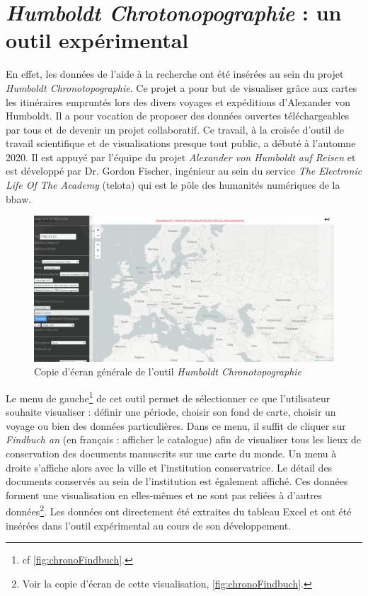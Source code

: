 \documentclass[a4paper, 12pt, twoside]{book}
\begin{document}
\section{\textit{Humboldt Chrotonopographie} : un outil expérimental}
\label{sect:chronotopographie}
En effet, les données de l'aide à la recherche ont été insérées au sein du projet \textit{Humboldt Chronotopographie}. Ce projet a pour but de visualiser grâce aux cartes les itinéraires empruntés lors des divers voyages et expéditions d'Alexander von Humboldt. Il a pour vocation de proposer des données ouvertes téléchargeables par tous et de devenir un projet collaboratif. Ce travail, à la croisée d'outil de travail scientifique et de visualisations presque tout public, a débuté à l'automne 2020. Il est appuyé par l'équipe du projet \textit{Alexander von Humboldt auf Reisen} et est développé par Dr. Gordon Fischer, ingénieur au sein du service \textit{The Electronic Life Of The Academy} (\gls{telota}) qui est le pôle des humanités numériques de la \gls{bbaw}.
\begin{figure}[h]
    \centering
    \caption{Copie d'écran générale de l'outil \textit{Humboldt Chronotopographie}}
    \includegraphics[scale=0.4]{img/chronotopographie/chrono_general.png}
    \hfill
\end{figure}

Le menu de gauche\footnote{cf \autoref{fig:chronoFindbuch}.} de cet outil permet de sélectionner ce que l'utilisateur souhaite visualiser : définir une période, choisir son fond de carte, choisir un voyage ou bien des données particulières. Dans ce menu, il suffit de cliquer sur \textit{Findbuch an} (en français : afficher le catalogue) afin de visualiser tous les lieux de conservation des documents manuscrits sur une carte du monde. Un menu à droite s'affiche alors avec la ville et l'institution conservatrice. Le détail des documents conservés au sein de l'institution est également affiché. Ces données forment une visualisation en elles-mêmes et ne sont pas reliées à d'autres données\footnote{Voir la copie d'écran de cette visualisation,  \autoref{fig:chronoFindbuch}.}. Les données ont directement été extraites du tableau Excel et ont été insérées dans l'outil expérimental au cours de son développement. 
\end{document}

